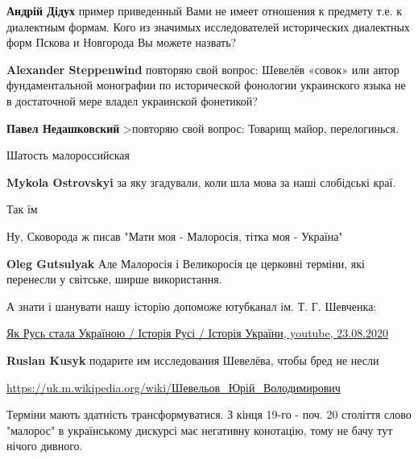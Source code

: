 \begin{itemize}
\begin{itemize}
\textbf{Андрій Дідух} пример приведенный Вами не имеет отношения к предмету т.е. к диалектным формам. Кого из значимых исследователей исторических диалектных форм Пскова и Новгорода Вы можете назвать?

\textbf{Alexander Steppenwind} повторяю свой вопрос: Шевелёв «совок» или автор фундаментальной монографии по исторической фонологии украинского языка не в достаточной мере владел украинской фонетикой?

\textbf{Павел Недашковский} >повторяю свой вопрос:
Товарищ майор, перелогинься.

\end{itemize} %

Шатость малороссийская

\begin{itemize} %
\textbf{Mykola Ostrovskyi} за яку згадували, коли шла мова за наші слобідські краї.
\end{itemize} %

Так їм

Ну, Сковорода ж писав "Мати моя - Малоросія, тітка моя - Україна"

\begin{itemize} %
\textbf{Oleg Gutsulyak} Але Малоросія і Великоросія це церковні терміни, які перенесли у світське, ширше використання.
\end{itemize} %


А знати і шанувати нашу історію допоможе ютубканал ім. Т. Г. Шевченка:

\href{https://youtu.be/5Zna0WTzFtY}{%
Як Русь стала Україною / Історія Русі / Історія України, youtube, 23.08.2020%
}

\begin{itemize} %
\textbf{Ruslan Kusyk} подарите им исследования Шевелёва, чтобы бред не несли

\url{https://uk.m.wikipedia.org/wiki/Шевельов_Юрій_Володимирович}

\end{itemize} %


Терміни мають здатність трансформуватися. З кінця 19-го - поч. 20 століття
слово "малорос" в українському дискурсі має негативну конотацію, тому не бачу
тут нічого дивного.


\end{itemize}
